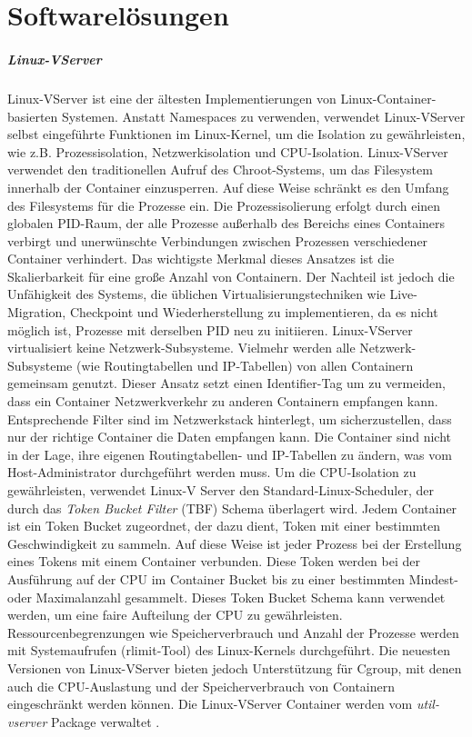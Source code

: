 \thispagestyle{empty}

\section{Softwarelösungen}

\subparagraph{Linux-VServer}
Linux-VServer ist eine der ältesten Implementierungen von Linux-Container-basierten Systemen. Anstatt Namespaces zu verwenden, verwendet Linux-VServer selbst eingeführte Funktionen im Linux-Kernel, um die Isolation zu gewährleisten, wie z.B. Prozessisolation, Netzwerkisolation und CPU-Isolation. Linux-VServer verwendet den traditionellen Aufruf des Chroot-Systems, um das Filesystem innerhalb der Container einzusperren. Auf diese Weise schränkt es den Umfang des Filesystems für die Prozesse ein. Die Prozessisolierung erfolgt durch einen globalen PID-Raum, der alle Prozesse außerhalb des Bereichs eines Containers verbirgt und unerwünschte Verbindungen zwischen Prozessen verschiedener Container verhindert. Das wichtigste Merkmal dieses Ansatzes ist die Skalierbarkeit für eine große Anzahl von Containern. Der Nachteil ist jedoch die Unfähigkeit des Systems, die üblichen Virtualisierungstechniken wie Live-Migration, Checkpoint und Wiederherstellung zu implementieren, da es nicht möglich ist, Prozesse mit derselben PID neu zu initiieren. Linux-VServer virtualisiert keine Netzwerk-Subsysteme. Vielmehr werden alle Netzwerk-Subsysteme (wie Routingtabellen und IP-Tabellen) von allen Containern gemeinsam genutzt. Dieser Ansatz setzt einen Identifier-Tag um zu vermeiden, dass ein Container Netzwerkverkehr zu anderen Containern empfangen kann. Entsprechende Filter sind im Netzwerkstack hinterlegt, um sicherzustellen, dass nur der richtige Container die Daten empfangen kann. Die Container sind nicht in der Lage, ihre eigenen Routingtabellen- und IP-Tabellen zu ändern, was vom Host-Administrator durchgeführt werden muss. Um die CPU-Isolation zu gewährleisten, verwendet Linux-V Server den Standard-Linux-Scheduler, der durch das \emph{Token Bucket Filter} (TBF) Schema überlagert wird. Jedem Container ist ein Token Bucket zugeordnet, der dazu dient, Token mit einer bestimmten Geschwindigkeit zu sammeln. Auf diese Weise ist jeder Prozess bei der Erstellung eines Tokens mit einem Container verbunden. Diese Token werden bei der Ausführung auf der CPU im Container Bucket bis zu einer bestimmten Mindest- oder Maximalanzahl gesammelt. Dieses Token Bucket Schema kann verwendet werden, um eine faire Aufteilung der CPU zu gewährleisten. Ressourcenbegrenzungen wie Speicherverbrauch und Anzahl der Prozesse werden mit Systemaufrufen (rlimit-Tool) des Linux-Kernels durchgeführt. Die neuesten Versionen von Linux-VServer bieten jedoch Unterstützung für Cgroup, mit denen auch die CPU-Auslastung und der Speicherverbrauch von Containern eingeschränkt werden können. Die Linux-VServer Container werden vom \emph{util-vserver} \cite{Optionen2018Userspace-WerkzeugeLinux-VServer} Package verwaltet \cite{Overview2018PaperLinux-VServer} \cite{Xavier2015AClouds}.

